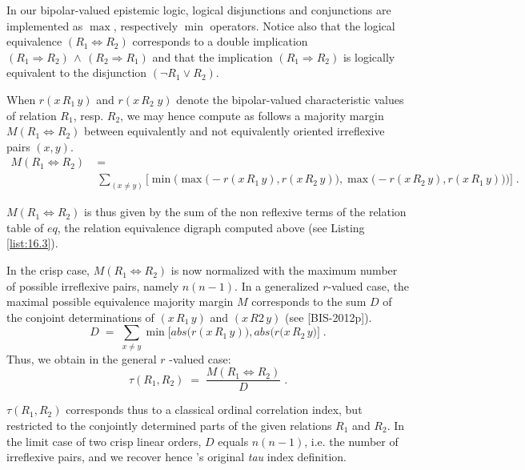 In our bipolar-valued epistemic logic, logical disjunctions and conjunctions are implemented as $\max$, respectively $\min$ operators. Notice also that the logical equivalence $(R_1 \Leftrightarrow R_2)$ corresponds to a double implication $(R_1 \Rightarrow R_2)\, \wedge \, (R_2 \Rightarrow  R_1)$ and that the implication $(R_1 \Rightarrow R_2)$ is logically equivalent to the disjunction $(\neg R_1 \vee R_2)$.

When $r(x\,R_1\, y)$ and $r(x\,R_2\; y)$ denote the bipolar-valued characteristic values of relation $R_1$, resp. $R_2$, we may hence compute as follows a majority margin $M(R_1 \Leftrightarrow R_2)$ between equivalently and not equivalently oriented irreflexive pairs $(x,y)$.
\begin{equation}\label{eq:16:2}
\left.\begin{aligned}
M(R_1 \Leftrightarrow R_2) \; &= \\  &\sum_{(x \neq y)} \Big[ \min \Big( \max \big( -r(x \,R_1\, y), r(x \,R_2\, y)\big), \max \big( -r(x \,R_2\, y), r(x \,R_1\, y)\big) \Big) \Big]\;.
\end{aligned}\right.
\end{equation}

$M(R_1 \Leftrightarrow R_2)$ is thus given by the sum of the non reflexive terms of the relation table of $eq$, the relation equivalence digraph computed above (see Listing \ref{list:16.3}).

In the crisp case, $M(R_1 \Leftrightarrow R_2)$  is now normalized with the maximum number of possible irreflexive pairs, namely $n(n-1)$. In a generalized $r$-valued case, the maximal possible equivalence majority margin $M$ corresponds to the sum $D$ of the conjoint determinations of $(x \,R_1\, y)$ and $(x \,R2\, y)$ (see [BIS-2012p]). 
\begin{equation}
  D \;=\; \sum_{x \neq y} \min \Big[ abs\big(r(x \,R_1\, y) \big), abs \big( r(x \,R_2\, y \big)  \Big]\;.
\end{equation}
Thus, we obtain in the general $r$ -valued case:
\begin{equation}
  \tau(R_1,R_2) \;=\; \frac{M(R_1 \Leftrightarrow R_2)}{D}\;.
\end{equation}

$\tau(R_1,R_2)$ corresponds thus to a classical ordinal correlation index, but restricted to the conjointly determined parts of the given relations $R_1$ and $R_2$. In the limit case of two crisp linear orders, $D$ equals $n(n-1)$, i.e. the number of irreflexive pairs, and we recover hence \Kendall 's original \emph{tau} index definition.

